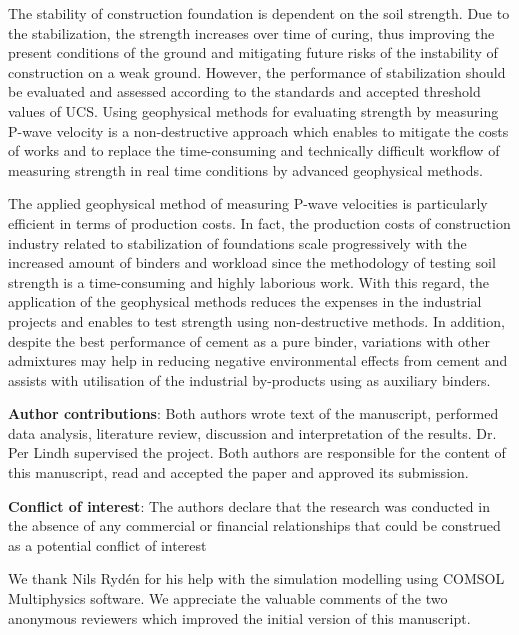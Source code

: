 \documentclass[USenglish,twocolumn]{article}
\begin{document}
The stability of construction foundation is dependent on the soil strength. Due to the stabilization, the strength increases over time of curing, thus improving the present conditions of the ground and mitigating future risks of the instability of construction on a weak ground. However, the performance of stabilization should be evaluated and assessed according to the standards and accepted threshold values of UCS. Using geophysical methods for evaluating strength by measuring P-wave velocity is a non-destructive approach which enables to mitigate the costs of works and to replace the time-consuming and technically difficult workflow of measuring strength in real time conditions by advanced geophysical methods.

The applied geophysical method of measuring P-wave velocities is particularly efficient in terms of production costs. In fact, the production costs of construction industry related to stabilization of foundations scale progressively with the increased amount of binders and workload since the methodology of testing soil strength is a time-consuming and highly laborious work. With this regard, the application of the geophysical methods reduces the expenses in the industrial projects and enables to test strength using non-destructive methods. In addition, despite the best performance of cement as a pure binder, variations with other admixtures may help in reducing negative environmental effects from cement and assists with utilisation of the industrial by-products using as auxiliary binders.

\vspace{5pt}

\noindent
\textbf{Author contributions}: Both authors wrote text of the manuscript, performed data analysis, literature review, discussion and interpretation of the results. Dr. Per Lindh supervised the project. Both authors are responsible for the content of this manuscript, read and accepted the paper and approved its submission.

\vspace{5pt}

\noindent
\textbf{Conflict of interest}: The authors declare that the research was conducted in the absence of any commercial or financial relationships that could be construed as a potential conflict of interest

\begin{acknowledgement}
We thank Nils Rydén for his help with the simulation modelling using COMSOL Multiphysics software. We appreciate the valuable comments of the two anonymous reviewers which improved the initial version of this manuscript. 
\end{acknowledgement}

%


\end{document}
